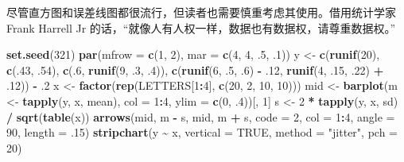 \documentclass[
  b5paper,
  UTF8,twoside]{book}
\newenvironment{Shaded}{\begin{snugshade}}{\end{snugshade}}
\newcommand{\AttributeTok}[1]{\textcolor[rgb]{0.13,0.29,0.53}{#1}}
\newcommand{\ConstantTok}[1]{\textcolor[rgb]{0.56,0.35,0.01}{#1}}
\newcommand{\DecValTok}[1]{\textcolor[rgb]{0.00,0.00,0.81}{#1}}
\newcommand{\FunctionTok}[1]{\textcolor[rgb]{0.13,0.29,0.53}{\textbf{#1}}}
\newcommand{\NormalTok}[1]{#1}
\newcommand{\OtherTok}[1]{\textcolor[rgb]{0.56,0.35,0.01}{#1}}
\newcommand{\SpecialCharTok}[1]{\textcolor[rgb]{0.81,0.36,0.00}{\textbf{#1}}}
\newcommand{\StringTok}[1]{\textcolor[rgb]{0.31,0.60,0.02}{#1}}
\begin{document}
尽管直方图和误差线图都很流行，但读者也需要慎重考虑其使用。借用统计学家 Frank Harrell Jr 的话，``就像人有人权一样，数据也有数据权，请尊重数据权。''

\begin{Shaded}
\begin{Highlighting}[]
\FunctionTok{set.seed}\NormalTok{(}\DecValTok{321}\NormalTok{)}
\FunctionTok{par}\NormalTok{(}\AttributeTok{mfrow =} \FunctionTok{c}\NormalTok{(}\DecValTok{1}\NormalTok{, }\DecValTok{2}\NormalTok{), }\AttributeTok{mar =} \FunctionTok{c}\NormalTok{(}\DecValTok{4}\NormalTok{, }\DecValTok{4}\NormalTok{, .}\DecValTok{5}\NormalTok{, .}\DecValTok{1}\NormalTok{))}
\NormalTok{y }\OtherTok{\textless{}{-}} \FunctionTok{c}\NormalTok{(}\FunctionTok{runif}\NormalTok{(}\DecValTok{20}\NormalTok{), }\FunctionTok{c}\NormalTok{(.}\DecValTok{43}\NormalTok{, .}\DecValTok{54}\NormalTok{), }\FunctionTok{c}\NormalTok{(.}\DecValTok{6}\NormalTok{, }\FunctionTok{runif}\NormalTok{(}\DecValTok{9}\NormalTok{, .}\DecValTok{3}\NormalTok{, .}\DecValTok{4}\NormalTok{)), }
       \FunctionTok{c}\NormalTok{(}\FunctionTok{runif}\NormalTok{(}\DecValTok{6}\NormalTok{, .}\DecValTok{5}\NormalTok{, .}\DecValTok{6}\NormalTok{) }\SpecialCharTok{{-}}\NormalTok{ .}\DecValTok{12}\NormalTok{, }\FunctionTok{runif}\NormalTok{(}\DecValTok{4}\NormalTok{, .}\DecValTok{15}\NormalTok{, .}\DecValTok{22}\NormalTok{) }\SpecialCharTok{+}\NormalTok{ .}\DecValTok{12}\NormalTok{)) }\SpecialCharTok{{-}}\NormalTok{ .}\DecValTok{2}
\NormalTok{x }\OtherTok{\textless{}{-}} \FunctionTok{factor}\NormalTok{(}\FunctionTok{rep}\NormalTok{(LETTERS[}\DecValTok{1}\SpecialCharTok{:}\DecValTok{4}\NormalTok{], }\FunctionTok{c}\NormalTok{(}\DecValTok{20}\NormalTok{, }\DecValTok{2}\NormalTok{, }\DecValTok{10}\NormalTok{, }\DecValTok{10}\NormalTok{)))}
\NormalTok{mid }\OtherTok{\textless{}{-}} \FunctionTok{barplot}\NormalTok{(m }\OtherTok{\textless{}{-}} \FunctionTok{tapply}\NormalTok{(y, x, mean), }\AttributeTok{col =} \DecValTok{1}\SpecialCharTok{:}\DecValTok{4}\NormalTok{, }\AttributeTok{ylim =} \FunctionTok{c}\NormalTok{(}\DecValTok{0}\NormalTok{, .}\DecValTok{4}\NormalTok{))[, }\DecValTok{1}\NormalTok{]}
\NormalTok{s }\OtherTok{\textless{}{-}} \DecValTok{2} \SpecialCharTok{*} \FunctionTok{tapply}\NormalTok{(y, x, sd) }\SpecialCharTok{/} \FunctionTok{sqrt}\NormalTok{(}\FunctionTok{table}\NormalTok{(x))}
\FunctionTok{arrows}\NormalTok{(mid, m }\SpecialCharTok{{-}}\NormalTok{ s, mid, m }\SpecialCharTok{+}\NormalTok{ s, }\AttributeTok{code =} \DecValTok{2}\NormalTok{, }\AttributeTok{col =} \DecValTok{1}\SpecialCharTok{:}\DecValTok{4}\NormalTok{, }\AttributeTok{angle =} \DecValTok{90}\NormalTok{, }\AttributeTok{length =}\NormalTok{ .}\DecValTok{15}\NormalTok{)}
\FunctionTok{stripchart}\NormalTok{(y }\SpecialCharTok{\textasciitilde{}}\NormalTok{ x, }\AttributeTok{vertical =} \ConstantTok{TRUE}\NormalTok{, }\AttributeTok{method =} \StringTok{"jitter"}\NormalTok{, }\AttributeTok{pch =} \DecValTok{20}\NormalTok{)}
\end{Highlighting}
\end{Shaded}
\end{document}
